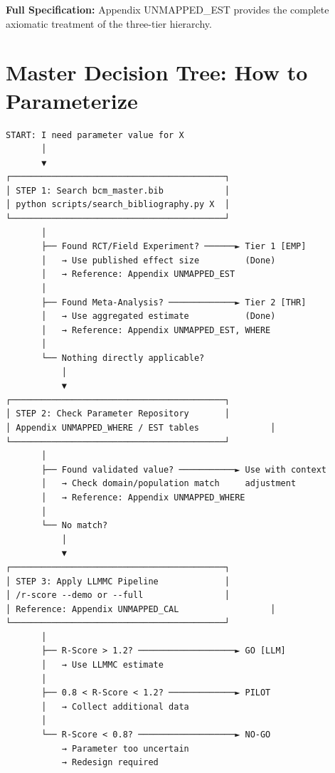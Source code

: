 \textbf{Full Specification:} Appendix UNMAPPED_EST provides the complete axiomatic treatment of the three-tier hierarchy.


\section{Master Decision Tree: How to Parameterize}
\label{sec:pm-decision-tree}

\begin{tcolorbox}[colback=yellow!5!white, colframe=yellow!75!black, title=The Parameterization Decision Tree]
\begin{verbatim}
START: I need parameter value for X
       │
       ▼
┌──────────────────────────────────────────┐
│ STEP 1: Search bcm_master.bib            │
│ python scripts/search_bibliography.py X  │
└──────────────────────────────────────────┘
       │
       ├── Found RCT/Field Experiment? ──────► Tier 1 [EMP]
       │   → Use published effect size         (Done)
       │   → Reference: Appendix UNMAPPED_EST
       │
       ├── Found Meta-Analysis? ─────────────► Tier 2 [THR]
       │   → Use aggregated estimate           (Done)
       │   → Reference: Appendix UNMAPPED_EST, WHERE
       │
       └── Nothing directly applicable?
           │
           ▼
┌──────────────────────────────────────────┐
│ STEP 2: Check Parameter Repository       │
│ Appendix UNMAPPED_WHERE / EST tables              │
└──────────────────────────────────────────┘
       │
       ├── Found validated value? ───────────► Use with context
       │   → Check domain/population match     adjustment
       │   → Reference: Appendix UNMAPPED_WHERE
       │
       └── No match?
           │
           ▼
┌──────────────────────────────────────────┐
│ STEP 3: Apply LLMMC Pipeline             │
│ /r-score --demo or --full                │
│ Reference: Appendix UNMAPPED_CAL                  │
└──────────────────────────────────────────┘
       │
       ├── R-Score > 1.2? ───────────────────► GO [LLM]
       │   → Use LLMMC estimate
       │
       ├── 0.8 < R-Score < 1.2? ─────────────► PILOT
       │   → Collect additional data
       │
       └── R-Score < 0.8? ───────────────────► NO-GO
           → Parameter too uncertain
           → Redesign required
\end{verbatim}
\end{tcolorbox}

